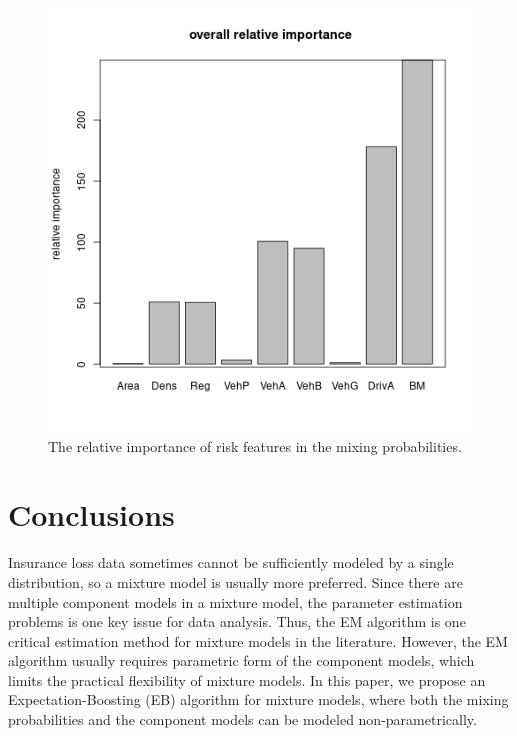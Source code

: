 \documentclass[11pt]{article}
\numberwithin{equation}{section}
\def\bx{\boldsymbol{x}}
\begin{document}
\begin{figure}[htp!]
							\includegraphics[width=0.4\linewidth]{../plots/sev/sev0}
	\caption{The relative importance of risk features in the mixing probabilities.}\label{sev-var-imp}
\end{figure}



\section{Conclusions}\label{sec:conclusions}
Insurance loss data sometimes cannot be sufficiently modeled by a single distribution, 
so a mixture model is usually more preferred. 
Since there are multiple component models in a mixture model, 
the parameter estimation problems is one key issue for data analysis. 
Thus, the EM algorithm is one critical estimation method for mixture models in the literature.
However, the EM algorithm usually requires parametric form of the component models, which limits the practical flexibility of mixture models.
In this paper, we propose an Expectation-Boosting (EB) algorithm for mixture models, 
where both the mixing probabilities and the component models can be modeled non-parametrically. 
\end{document}
